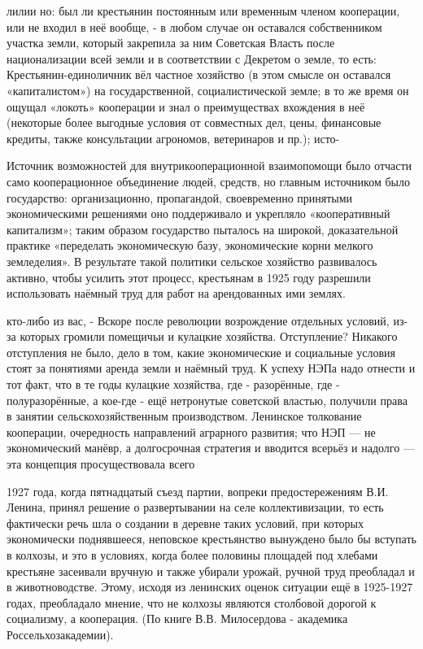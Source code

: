 лилии но: был ли крестьянин постоянным или временным членом кооперации, или не входил в неё вообще, - в любом случае он оставался собственником участка земли, который закрепила за ним Советская Власть после национализации всей земли и в соответствии с Декретом о земле, то есть: Крестьянин-единоличник вёл частное хозяйство (в этом смысле он оставался «капиталистом») на государственной, социалистической земле; в то же время он ощущал «локоть» кооперации и знал о преимуществах вхождения в неё (некоторые более выгодные условия от совместных дел, цены, финансовые кредиты, также консультации агрономов, ветеринаров и пр.); исто-

Источник возможностей для внутрикооперационной взаимопомощи было отчасти само кооперационное объединение людей, средств, но главным источником было государство: организационно, пропагандой, своевременно принятыми экономическими решениями оно поддерживало и укрепляло «кооперативный капитализм»; таким образом государство пыталось на широкой, доказательной практике «переделать экономическую базу, экономические корни мелкого земледелия». В результате такой политики сельское хозяйство развивалось активно, чтобы усилить этот процесс, крестьянам в 1925 году разрешили использовать наёмный труд для работ на арендованных ими землях.

кто-либо из вас, - Вскоре после революции возрождение отдельных условий, из-за которых громили помещичьи и кулацкие хозяйства. Отступление? Никакого отступления не было, дело в том, какие экономические и социальные условия стоят за понятиями аренда земли и наёмный труд. К успеху НЭПа надо отнести и тот факт, что в те годы кулацкие хозяйства, где - разорённые, где - полуразорённые, а кое-где - ещё нетронутые советской властью, получили права в занятии сельскохозяйственным производством. Ленинское толкование кооперации, очередность направлений аграрного развития; что НЭП — не экономический манёвр, а долгосрочная стратегия и вводится всерьёз и надолго — эта концепция просуществовала всего

1927 года, когда пятнадцатый съезд партии, вопреки предостережениям В.И. Ленина, принял решение о развертывании на селе коллективизации, то есть фактически речь шла о создании в деревне таких условий, при которых экономически поднявшееся, неповское крестьянство вынуждено было бы вступать в колхозы, и это в условиях, когда более половины площадей под хлебами крестьяне засеивали вручную и также убирали урожай, ручной труд преобладал и в животноводстве. Этому, исходя из ленинских оценок ситуации ещё в 1925-1927 годах, преобладало мнение, что не колхозы являются столбовой дорогой к социализму, а кооперация. (По книге В.В. Милосердова - академика Россельхозакадемии).

